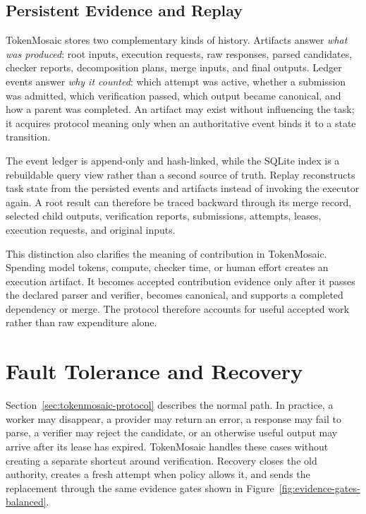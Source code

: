 \documentclass{article}
\theoremstyle{plain}
\begin{document}
\subsection{Persistent Evidence and Replay}
\label{subsec:persistent-evidence}

TokenMosaic stores two complementary kinds of history. Artifacts answer \emph{what was produced}: root inputs, execution requests, raw responses, parsed candidates, checker reports, decomposition plans, merge inputs, and final outputs. Ledger events answer \emph{why it counted}: which attempt was active, whether a submission was admitted, which verification passed, which output became canonical, and how a parent was completed. An artifact may exist without influencing the task; it acquires protocol meaning only when an authoritative event binds it to a state transition.

The event ledger is append-only and hash-linked, while the SQLite index is a rebuildable query view rather than a second source of truth. Replay reconstructs task state from the persisted events and artifacts instead of invoking the executor again. A root result can therefore be traced backward through its merge record, selected child outputs, verification reports, submissions, attempts, leases, execution requests, and original inputs.

This distinction also clarifies the meaning of contribution in TokenMosaic. Spending model tokens, compute, checker time, or human effort creates an execution artifact. It becomes accepted contribution evidence only after it passes the declared parser and verifier, becomes canonical, and supports a completed dependency or merge. The protocol therefore accounts for useful accepted work rather than raw expenditure alone.


\section{Fault Tolerance and Recovery}
\label{sec:bounded-recovery}

Section~\ref{sec:tokenmosaic-protocol} describes the normal path. In practice, a worker may disappear, a provider may return an error, a response may fail to parse, a verifier may reject the candidate, or an otherwise useful output may arrive after its lease has expired. TokenMosaic handles these cases without creating a separate shortcut around verification. Recovery closes the old authority, creates a fresh attempt when policy allows it, and sends the replacement through the same evidence gates shown in Figure~\ref{fig:evidence-gates-balanced}.
\end{document}
